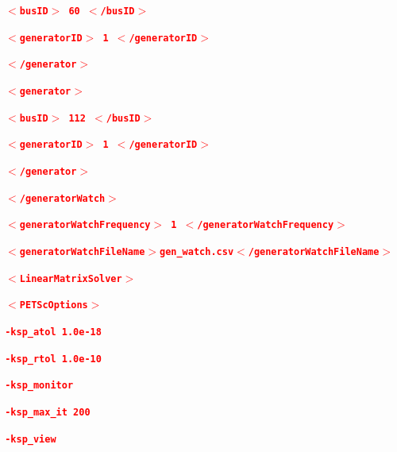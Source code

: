 \documentclass[12pt]{report} %
\begin{document}
\textcolor{red}{\texttt{\textbf{       $\boldsymbol{\mathrm{<}}$busID$\boldsymbol{\mathrm{>}}$ 60 $\boldsymbol{\mathrm{<}}$/busID$\boldsymbol{\mathrm{>}}$}}}

\textcolor{red}{\texttt{\textbf{       $\boldsymbol{\mathrm{<}}$generatorID$\boldsymbol{\mathrm{>}}$ 1 $\boldsymbol{\mathrm{<}}$/generatorID$\boldsymbol{\mathrm{>}}$}}}

\textcolor{red}{\texttt{\textbf{      $\boldsymbol{\mathrm{<}}$/generator$\boldsymbol{\mathrm{>}}$}}}

\textcolor{red}{\texttt{\textbf{      $\boldsymbol{\mathrm{<}}$generator$\boldsymbol{\mathrm{>}}$}}}

\textcolor{red}{\texttt{\textbf{       $\boldsymbol{\mathrm{<}}$busID$\boldsymbol{\mathrm{>}}$ 112 $\boldsymbol{\mathrm{<}}$/busID$\boldsymbol{\mathrm{>}}$}}}

\textcolor{red}{\texttt{\textbf{       $\boldsymbol{\mathrm{<}}$generatorID$\boldsymbol{\mathrm{>}}$ 1 $\boldsymbol{\mathrm{<}}$/generatorID$\boldsymbol{\mathrm{>}}$}}}

\textcolor{red}{\texttt{\textbf{      $\boldsymbol{\mathrm{<}}$/generator$\boldsymbol{\mathrm{>}}$}}}

\textcolor{red}{\texttt{\textbf{    $\boldsymbol{\mathrm{<}}$/generatorWatch$\boldsymbol{\mathrm{>}}$}}}

\textcolor{red}{\texttt{\textbf{    $\boldsymbol{\mathrm{<}}$generatorWatchFrequency$\boldsymbol{\mathrm{>}}$ 1 $\boldsymbol{\mathrm{<}}$/generatorWatchFrequency$\boldsymbol{\mathrm{>}}$}}}

\textcolor{red}{\texttt{\textbf{    $\boldsymbol{\mathrm{<}}$generatorWatchFileName$\boldsymbol{\mathrm{>}}$gen\_watch.csv$\boldsymbol{\mathrm{<}}$/generatorWatchFileName$\boldsymbol{\mathrm{>}}$}}}

\textcolor{red}{\texttt{\textbf{    $\boldsymbol{\mathrm{<}}$LinearMatrixSolver$\boldsymbol{\mathrm{>}}$}}}

\textcolor{red}{\texttt{\textbf{      $\boldsymbol{\mathrm{<}}$PETScOptions$\boldsymbol{\mathrm{>}}$}}}

\textcolor{red}{\texttt{\textbf{        -ksp\_atol 1.0e-18}}}

\textcolor{red}{\texttt{\textbf{        -ksp\_rtol 1.0e-10}}}

\textcolor{red}{\texttt{\textbf{        -ksp\_monitor}}}

\textcolor{red}{\texttt{\textbf{        -ksp\_max\_it 200}}}

\textcolor{red}{\texttt{\textbf{        -ksp\_view}}}
\end{document}
